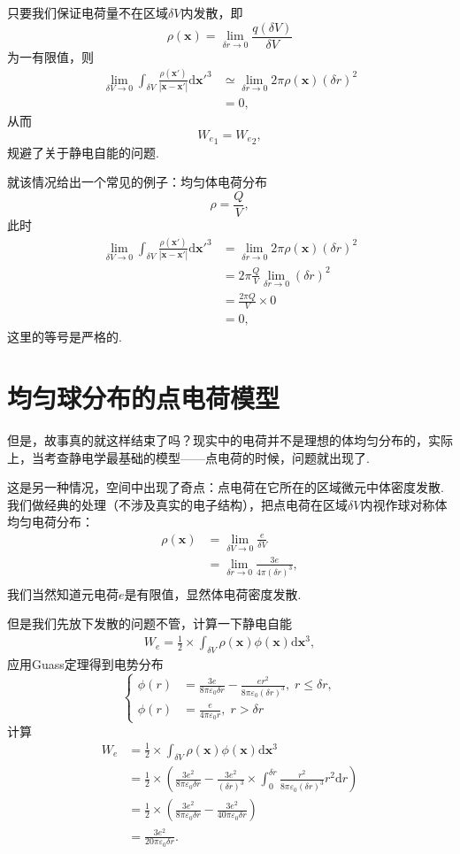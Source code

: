 \documentclass[12pt]{article}
\newcommand{\de}[1]{\mathrm{d}#1}
\newcommand{\mbf}[1]{\mathbf{#1}}
\newcommand{\kh}[1]{\left(#1\right)}
\newcommand{\dkhz}[1]{\left\{#1\right.}
\begin{document}
只要我们保证电荷量不在区域\(\delta V\)内发散，即
\[\rho\kh{\mbf x}=\lim_{\delta r \to 0}\frac{q\kh{\delta V}}{\delta V}\]
为一有限值，则
\begin{align*}
    \lim_{\delta V \to 0}\int_{\delta V}\frac{\rho \kh{\mbf x'}}{|\mbf x - \mbf x'|} \de {\mbf x'}^3 &\simeq \lim_{\delta r \to 0} 2\pi \rho\kh{\mbf x}\kh{\delta r}^2\\
    &=0,
\end{align*}
从而
\[{W_e}_1={W_e}_2,\]
规避了关于静电自能的问题.

就该情况给出一个常见的例子：均匀体电荷分布
\[\rho=\frac{Q}{V},\]
此时
\begin{align*}
    \lim_{\delta V \to 0}\int_{\delta V}\frac{\rho \kh{\mbf x'}}{|\mbf x - \mbf x'|} \de {\mbf x'}^3 &= \lim_{\delta r \to 0} 2\pi \rho\kh{\mbf x}\kh{\delta r}^2\\
    &=2\pi \frac{Q}{V}\lim_{\delta r \to 0}\kh{\delta r}^2 \\
    &=\frac{2\pi Q}{V}\times 0\\
    &= 0,
\end{align*}
这里的等号是严格的.
\section{均匀球分布的点电荷模型}
但是，故事真的就这样结束了吗？现实中的电荷并不是理想的体均匀分布的，实际上，当考查静电学最基础的模型——点电荷的时候，问题就出现了.

这是另一种情况，空间中出现了奇点：点电荷在它所在的区域微元中体密度发散. 我们做经典的处理（不涉及真实的电子结构），把点电荷在区域\(\delta V\)内视作球对称体均匀电荷分布：
\begin{align*}
    \rho\kh{\mbf x}&=\lim_{\delta V\to0}\frac{e}{\delta V}\\
    &=\lim_{\delta r\to0}\frac{3e}{4\pi \kh{\delta r}^3},\\
\end{align*}
我们当然知道元电荷\(e\)是有限值，显然体电荷密度发散.

但是我们先放下发散的问题不管，计算一下静电自能
\begin{align*}
    W_e=\frac{1}{2}\times\int_{\delta V}\rho\kh{\mbf x}\phi\kh{\mbf x}\de \mbf x^3,
\end{align*}
应用Guass定理得到电势分布
\[\dkhz{\begin{aligned}
    \phi\kh{r}&=\frac{3e}{8\pi \varepsilon_0\delta r}-\frac{er^2}{8\pi \varepsilon_0\kh{\delta r}^3},\;r\leq\delta r,\\ \phi\kh
    r&=\frac{e}{4\pi \varepsilon_0r},\;r>\delta r
\end{aligned}}\]
计算
\begin{align*}
    W_e&=\frac{1}{2}\times\int_{\delta V}\rho\kh{\mbf x}\phi\kh{\mbf x}\de \mbf x^3\\
    &=\frac{1}{2}\times\kh{\frac{3e^2}{8\pi \varepsilon_0\delta r}-\frac{3e^2}{\kh{\delta r}^3}\times\int_0^{\delta r}\frac{r^2}{8\pi \varepsilon_0\kh{\delta r}^3}r^2\de r}\\
    &=\frac{1}{2}\times\kh{\frac{3e^2}{8\pi \varepsilon_0\delta r}-\frac{3e^2}{40\pi \varepsilon_0\delta r}}\\
    &=\frac{3e^2}{20\pi \varepsilon_0\delta r}.
\end{align*}
\end{document}

